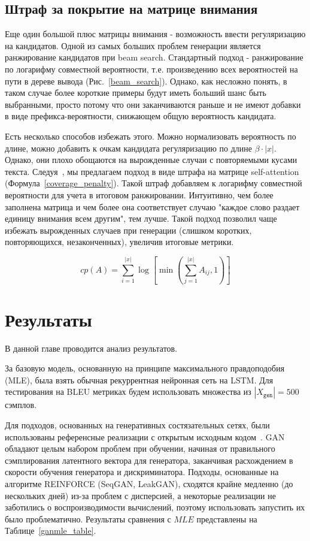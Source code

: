 \documentclass{spbau-diploma}
\begin{document}
\subsection{Штраф за покрытие на матрице внимания}
Еще один большой плюс матрицы внимания - возможность ввести регуляризацию на
кандидатов. Одной из самых больших проблем генерации является ранжирование 
кандидатов при beam search. Стандартный подход - ранжирование по логарифму 
совместной вероятности, т.е. произведению всех вероятностей на пути в дереве 
вывода (Рис.~\ref{beam_search}). Однако, как несложно понять, в таком случае 
более короткие примеры будут иметь больший шанс быть выбранными, просто потому 
что они заканчиваются раньше и не имеют добавки в виде префикса-вероятности, 
снижающем общую вероятность кандидата. 

Есть несколько способов избежать этого. Можно нормализовать вероятность по 
длине, можно добавить к очкам кандидата регуляризацию по длине 
$\beta \cdot |x|$. Однако, они плохо обощаются на вырожденные случаи с 
повторяемыми кусами текста. Следуя~\cite{1703.03906}, мы предлагаем подход в 
виде штрафа на матрице self-attention (Формула~\ref{coverage_penalty}). Такой
штраф добавляем к логарифму совместной вероятности для учета в итоговом 
ранжировании. Интуитивно, чем более заполнена матрица и чем более она 
соответствует случаю "каждое слово раздает единицу внимания всем другим", тем
лучше. Такой подход позволил чаще избежать вырожденных случаев
при генерации (слишком коротких, повторяющихся, незаконченных), увеличив 
итоговые метрики.

\begin{equation}
\label{coverage_penalty}
cp(A) = \sum\limits^{|x|}_{i=1}{\log \left[\min(\sum\limits^{|x|}_{j=1}{A_{ij}}, 1) \right]}
\end{equation}

\section{Результаты}
В данной главе проводится анализ результатов.

За базовую модель, основанную на принципе максимального правдоподобия 
(MLE), была взять обычная рекуррентная нейронная сеть на LSTM. Для 
тестирования на BLEU метриках будем использовать множества из 
$|X_{\texttt{gen}}|=500$ сэмплов.

Для подходов, основанных на генеративных состязательных сетях, были 
использованы референсные реализации с открытым исходным 
кодом~\cite{seqgan, leakgan, gsgan}. 
GAN обладают
целым набором проблем при обучении, начиная от правильного сэмплирования 
латентного вектора для генератора, заканчивая расхождением в скорости обучения 
генератора и дискриминатора. Подходы, основанные на алгоритме 
REINFORCE (SeqGAN, LeakGAN), сходятся крайне медленно (до нескольких дней) 
из-за проблем с дисперсией, а некоторые реализации не заботились о 
воспроизводимости вычислений, поэтому использовать запустить их было 
проблематично. Результаты сравнения с $MLE$ представлены на 
Таблице~\ref{ganmle_table}.
\end{document}
